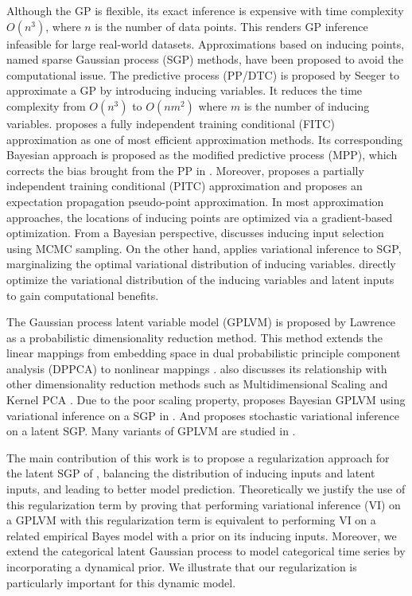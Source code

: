 \documentclass{article}
\begin{document}
Although the GP is flexible, its exact inference is expensive with time complexity $O(n^3)$, where $n$ is the number of data points. This renders GP inference infeasible for large real-world datasets. Approximations based on inducing points, named sparse Gaussian process (SGP) methods, have been proposed to avoid the computational issue. The predictive process (PP/DTC) is proposed by Seeger \citep{Seeger_2003} to approximate a GP by introducing inducing variables. It reduces the time complexity from $O(n^3)$ to $O(nm^2)$ where $m$ is the number of inducing variables. \cite{Snelson_2006} proposes a fully independent training conditional (FITC) approximation as one of most efficient approximation methods. Its corresponding Bayesian approach is proposed as the modified predictive process (MPP), which corrects the bias brought from the PP in \cite{Finley_2009}. Moreover, \cite{Snelson_2007} proposes a partially independent training conditional (PITC) approximation and \cite{Csato_2002} proposes an expectation propagation pseudo-point approximation. In most approximation approaches, the locations of inducing points are optimized via a gradient-based optimization. From a Bayesian perspective, \cite{Raj_2011} discusses inducing input selection using MCMC sampling. On the other hand, \cite{Titsias_2009} applies variational inference to SGP, marginalizing the optimal variational distribution of inducing variables. \cite{Hensman_2012, Hensman_2013} directly optimize the variational distribution of the inducing variables and latent inputs to gain computational benefits.

The Gaussian process latent variable model (GPLVM) \citep{Lawrence_2003} is proposed by Lawrence as a probabilistic dimensionality reduction method. This method extends the linear mappings from embedding space in dual probabilistic principle component analysis (DPPCA) to nonlinear mappings \citep{Lawrence_2003, Lawrence_2005}. \cite{Lawrence_2005} also discusses its relationship with other dimensionality reduction methods such as Multidimensional Scaling \citep{Mardia_1979} and Kernel PCA \citep{Scholkopf_1998}. Due to the poor scaling property, \cite{Titsias_2010} proposes Bayesian GPLVM using variational inference on a SGP in \cite{Titsias_2009}. And \cite{Hensman_2013} proposes stochastic variational inference on a latent SGP. Many variants of GPLVM are studied in \cite{Lawrence_2007_HGP, Lawrence_2006, Urtasun_2007}.

The main contribution of this work is to propose a regularization approach for the latent SGP of \citep{Hensman_2013}, balancing the distribution of inducing inputs and latent inputs, and leading to better model prediction. Theoretically we justify the use of this regularization term by proving that performing variational inference (VI) on a GPLVM with this regularization term is equivalent to performing VI on a related empirical Bayes model with a prior on its inducing inputs. Moreover, we extend the categorical latent Gaussian process \citep{Gal_2015} to model categorical time series by incorporating a dynamical prior. We illustrate that our regularization is particularly important for this dynamic model.
\end{document}
